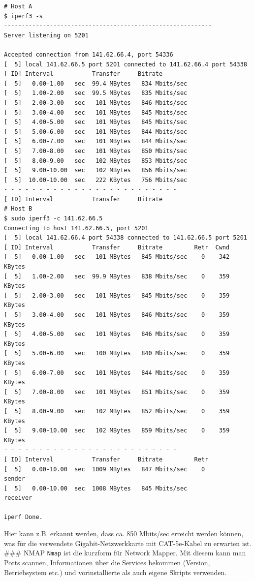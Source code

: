 \begin{verbatim}
# Host A
$ iperf3 -s
-----------------------------------------------------------
Server listening on 5201
-----------------------------------------------------------
Accepted connection from 141.62.66.4, port 54336
[  5] local 141.62.66.5 port 5201 connected to 141.62.66.4 port 54338
[ ID] Interval           Transfer     Bitrate
[  5]   0.00-1.00   sec  99.4 MBytes   834 Mbits/sec
[  5]   1.00-2.00   sec  99.5 MBytes   835 Mbits/sec
[  5]   2.00-3.00   sec   101 MBytes   846 Mbits/sec
[  5]   3.00-4.00   sec   101 MBytes   845 Mbits/sec
[  5]   4.00-5.00   sec   101 MBytes   845 Mbits/sec
[  5]   5.00-6.00   sec   101 MBytes   844 Mbits/sec
[  5]   6.00-7.00   sec   101 MBytes   844 Mbits/sec
[  5]   7.00-8.00   sec   101 MBytes   850 Mbits/sec
[  5]   8.00-9.00   sec   102 MBytes   853 Mbits/sec
[  5]   9.00-10.00  sec   102 MBytes   856 Mbits/sec
[  5]  10.00-10.00  sec   222 KBytes   756 Mbits/sec
- - - - - - - - - - - - - - - - - - - - - - - - -
[ ID] Interval           Transfer     Bitrate
# Host B
$ sudo iperf3 -c 141.62.66.5
Connecting to host 141.62.66.5, port 5201
[  5] local 141.62.66.4 port 54338 connected to 141.62.66.5 port 5201
[ ID] Interval           Transfer     Bitrate         Retr  Cwnd
[  5]   0.00-1.00   sec   101 MBytes   845 Mbits/sec    0    342 KBytes
[  5]   1.00-2.00   sec  99.9 MBytes   838 Mbits/sec    0    359 KBytes
[  5]   2.00-3.00   sec   101 MBytes   845 Mbits/sec    0    359 KBytes
[  5]   3.00-4.00   sec   101 MBytes   846 Mbits/sec    0    359 KBytes
[  5]   4.00-5.00   sec   101 MBytes   846 Mbits/sec    0    359 KBytes
[  5]   5.00-6.00   sec   100 MBytes   840 Mbits/sec    0    359 KBytes
[  5]   6.00-7.00   sec   101 MBytes   844 Mbits/sec    0    359 KBytes
[  5]   7.00-8.00   sec   101 MBytes   851 Mbits/sec    0    359 KBytes
[  5]   8.00-9.00   sec   102 MBytes   852 Mbits/sec    0    359 KBytes
[  5]   9.00-10.00  sec   102 MBytes   859 Mbits/sec    0    359 KBytes
- - - - - - - - - - - - - - - - - - - - - - - - -
[ ID] Interval           Transfer     Bitrate         Retr
[  5]   0.00-10.00  sec  1009 MBytes   847 Mbits/sec    0             sender
[  5]   0.00-10.00  sec  1008 MBytes   845 Mbits/sec                  receiver

iperf Done.
\end{verbatim}

Hier kann z.B. erkannt werden, dass ca. 850 Mbits/sec erreicht werden
können, was für die verwendete Gigabit-Netzwerkkarte mit CAT-5e-Kabel zu
erwarten ist. \#\#\# NMAP \texttt{Nmap} ist die kurzform für Network
Mapper. Mit diesem kann man Ports scannen, Informationen über die
Services bekommen (Version, Betriebsystem etc.) und vorinstallierte als
auch eigene Skripts verwenden.

